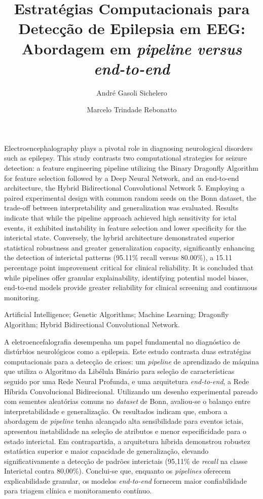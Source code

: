 \documentclass[alpha-refs,brazilian]{CC-EC_TF-TC}
\title{Estratégias Computacionais para Detecção de Epilepsia em EEG: Abordagem em \textit{pipeline versus end-to-end}}
\author[1]{André Gasoli Sichelero}
\author[2]{Marcelo Trindade Rebonatto}
\affil[1]{Universidade de Passo Fundo, Instituto de Ciências Exatas e Geociências, Ciência da Computação}
\begin{document}
\begin{frontmatter}
\maketitle
\thispagestyle{empty}
\begin{Abstract}
Electroencephalography plays a pivotal role in diagnosing neurological disorders such as epilepsy. This study contrasts two computational strategies for seizure detection: a feature engineering pipeline utilizing the Binary Dragonfly Algorithm for feature selection followed by a Deep Neural Network, and an end-to-end architecture, the Hybrid Bidirectional Convolutional Network 5. Employing a paired experimental design with common random seeds on the Bonn dataset, the trade-off between interpretability and generalization was evaluated. Results indicate that while the pipeline approach achieved high sensitivity for ictal events, it exhibited instability in feature selection and lower specificity for the interictal state. Conversely, the hybrid architecture demonstrated superior statistical robustness and greater generalization capacity, significantly enhancing the detection of interictal patterns (95.11\% recall versus 80.00\%), a 15.11 percentage point improvement critical for clinical reliability. It is concluded that while pipelines offer granular explainability, identifying potential model biases, end-to-end models provide greater reliability for clinical screening and continuous monitoring.
\end{Abstract}
\begin{keywords}
    Artificial Intelligence; Genetic Algorithms; Machine Learning; Dragonfly Algorithm; Hybrid Bidirectional Convolutional Network.
\end{keywords}
\begin{resumo}
    A eletroencefalografia desempenha um papel fundamental no diagnóstico de distúrbios neurológicos como a epilepsia. Este estudo contrasta duas estratégias computacionais para a detecção de crises: um \textit{pipeline} de aprendizado de máquina que utiliza o Algoritmo da Libélula Binário para seleção de características seguido por uma Rede Neural Profunda, e uma arquitetura \textit{end-to-end}, a Rede Híbrida Convolucional Bidirecional. Utilizando um desenho experimental pareado com sementes aleatórias comuns no \textit{dataset} de Bonn, avaliou-se o balanço entre interpretabilidade e generalização. Os resultados indicam que, embora a abordagem de \textit{pipeline} tenha alcançado alta sensibilidade para eventos ictais, apresentou instabilidade na seleção de atributos e menor especificidade para o estado interictal. Em contrapartida, a arquitetura híbrida demonstrou robustez estatística superior e maior capacidade de generalização, elevando significativamente a detecção de padrões interictais (95,11\% de \textit{recall} na classe Interictal contra 80,00\%). Conclui-se que, enquanto os \textit{pipelines} oferecem explicabilidade granular, os modelos \textit{end-to-end} fornecem maior confiabilidade para triagem clínica e monitoramento contínuo.

\end{resumo}
\end{frontmatter}
\end{document}
